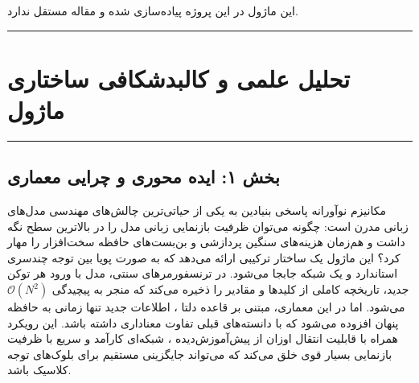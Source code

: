 \clearpage
{}
\vspace*{0.2cm}

این ماژول در این پروژه پیاده‌سازی شده و مقاله مستقل ندارد.
\noindent\rule{\textwidth}{1.2pt}
\vspace*{0.1cm}
\section{تحلیل علمی و کالبدشکافی ساختاری ماژول }
\label{sec:mod_gated_deltanet_block}
\vspace*{-0.2cm}
\noindent\rule{\textwidth}{0.5pt}
\vspace*{0.3cm}

\subsection*{بخش ۱: ایده محوری و چرایی معماری }
مکانیزم نوآورانه  پاسخی بنیادین به یکی از حیاتی‌ترین چالش‌های مهندسی مدل‌های زبانی مدرن است: چگونه می‌توان ظرفیت بازنمایی زبانی مدل را در بالاترین سطح نگه داشت و هم‌زمان هزینه‌های سنگین پردازشی و بن‌بست‌های حافظه سخت‌افزار را مهار کرد؟ این ماژول یک ساختار ترکیبی  ارائه می‌دهد که به صورت پویا بین توجه چندسری استاندارد  و یک شبکه  جابجا می‌شود.
در ترنسفورمرهای سنتی، مدل با ورود هر توکن جدید، تاریخچه کاملی از کلیدها و مقادیر را ذخیره می‌کند که منجر به پیچیدگی $\mathcal{O}(N^2)$ می‌شود. اما در این معماری، مبتنی بر قاعده دلتا ، اطلاعات جدید تنها زمانی به حافظه پنهان افزوده می‌شود که با دانسته‌های قبلی تفاوت معناداری داشته باشد. این رویکرد همراه با قابلیت انتقال اوزان از پیش‌آموزش‌دیده ، شبکه‌ای کارآمد و سریع با ظرفیت بازنمایی بسیار قوی خلق می‌کند که می‌تواند جایگزینی مستقیم  برای بلوک‌های توجه کلاسیک باشد.

